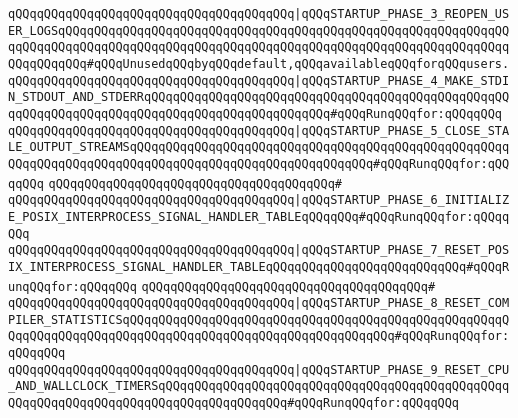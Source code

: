 \verb|qQQqqQQqqQQqqQQqqQQqqQQqqQQqqQQqqQQqqQQq|\verb#|qQQqSTARTUP_PHASE_3_REOPEN_USER_LOGSqQQqqQQqqQQqqQQqqQQqqQQqqQQqqQQqqQQqqQQqqQQqqQQqqQQqqQQqqQQqqQQqqQQqqQQqqQQqqQQqqQQqqQQqqQQqqQQqqQQqqQQqqQQqqQQqqQQqqQQqqQQqqQQqqQQqqQQqqQQqqQQq#\verb|#qQQqUnusedqQQqbyqQQqdefault,qQQqavailableqQQqforqQQqusers.|\newline
\verb|qQQqqQQqqQQqqQQqqQQqqQQqqQQqqQQqqQQqqQQq|\verb#|qQQqSTARTUP_PHASE_4_MAKE_STDIN_STDOUT_AND_STDERRqQQqqQQqqQQqqQQqqQQqqQQqqQQqqQQqqQQqqQQqqQQqqQQqqQQqqQQqqQQqqQQqqQQqqQQqqQQqqQQqqQQqqQQqqQQqqQQq#\verb|#qQQqRunqQQqfor:qQQqqQQq|\newline
\verb|qQQqqQQqqQQqqQQqqQQqqQQqqQQqqQQqqQQqqQQq|\verb#|qQQqSTARTUP_PHASE_5_CLOSE_STALE_OUTPUT_STREAMSqQQqqQQqqQQqqQQqqQQqqQQqqQQqqQQqqQQqqQQqqQQqqQQqqQQqqQQqqQQqqQQqqQQqqQQqqQQqqQQqqQQqqQQqqQQqqQQqqQQqqQQq#\verb|#qQQqRunqQQqfor:qQQqqQQq|\newline
\verb|qQQqqQQqqQQqqQQqqQQqqQQqqQQqqQQqqQQqqQQq#|\newline
\verb|qQQqqQQqqQQqqQQqqQQqqQQqqQQqqQQqqQQqqQQq|\verb#|qQQqSTARTUP_PHASE_6_INITIALIZE_POSIX_INTERPROCESS_SIGNAL_HANDLER_TABLEqQQqqQQq#\verb|#qQQqRunqQQqfor:qQQqqQQq|\newline
\verb|qQQqqQQqqQQqqQQqqQQqqQQqqQQqqQQqqQQqqQQq|\verb#|qQQqSTARTUP_PHASE_7_RESET_POSIX_INTERPROCESS_SIGNAL_HANDLER_TABLEqQQqqQQqqQQqqQQqqQQqqQQqqQQq#\verb|#qQQqRunqQQqfor:qQQqqQQq|\newline
\verb|qQQqqQQqqQQqqQQqqQQqqQQqqQQqqQQqqQQqqQQq#|\newline
\verb|qQQqqQQqqQQqqQQqqQQqqQQqqQQqqQQqqQQqqQQq|\verb#|qQQqSTARTUP_PHASE_8_RESET_COMPILER_STATISTICSqQQqqQQqqQQqqQQqqQQqqQQqqQQqqQQqqQQqqQQqqQQqqQQqqQQqqQQqqQQqqQQqqQQqqQQqqQQqqQQqqQQqqQQqqQQqqQQqqQQqqQQqqQQq#\verb|#qQQqRunqQQqfor:qQQqqQQq|\newline
\verb|qQQqqQQqqQQqqQQqqQQqqQQqqQQqqQQqqQQqqQQq|\verb#|qQQqSTARTUP_PHASE_9_RESET_CPU_AND_WALLCLOCK_TIMERSqQQqqQQqqQQqqQQqqQQqqQQqqQQqqQQqqQQqqQQqqQQqqQQqqQQqqQQqqQQqqQQqqQQqqQQqqQQqqQQqqQQqqQQq#\verb|#qQQqRunqQQqfor:qQQqqQQq|\newline
